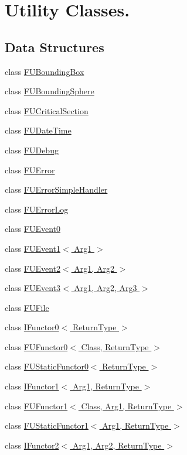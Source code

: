 \hypertarget{group__FUtils}{
\section{Utility Classes.}
\label{group__FUtils}
}
\subsection*{Data Structures}
\begin{DoxyCompactItemize}
\item 
class \hyperlink{classFUBoundingBox}{FUBoundingBox}
\item 
class \hyperlink{classFUBoundingSphere}{FUBoundingSphere}
\item 
class \hyperlink{classFUCriticalSection}{FUCriticalSection}
\item 
class \hyperlink{classFUDateTime}{FUDateTime}
\item 
class \hyperlink{classFUDebug}{FUDebug}
\item 
class \hyperlink{classFUError}{FUError}
\item 
class \hyperlink{classFUErrorSimpleHandler}{FUErrorSimpleHandler}
\item 
class \hyperlink{classFUErrorLog}{FUErrorLog}
\item 
class \hyperlink{classFUEvent0}{FUEvent0}
\item 
class \hyperlink{classFUEvent1}{FUEvent1$<$ Arg1 $>$}
\item 
class \hyperlink{classFUEvent2}{FUEvent2$<$ Arg1, Arg2 $>$}
\item 
class \hyperlink{classFUEvent3}{FUEvent3$<$ Arg1, Arg2, Arg3 $>$}
\item 
class \hyperlink{classFUFile}{FUFile}
\item 
class \hyperlink{classIFunctor0}{IFunctor0$<$ ReturnType $>$}
\item 
class \hyperlink{classFUFunctor0}{FUFunctor0$<$ Class, ReturnType $>$}
\item 
class \hyperlink{classFUStaticFunctor0}{FUStaticFunctor0$<$ ReturnType $>$}
\item 
class \hyperlink{classIFunctor1}{IFunctor1$<$ Arg1, ReturnType $>$}
\item 
class \hyperlink{classFUFunctor1}{FUFunctor1$<$ Class, Arg1, ReturnType $>$}
\item 
class \hyperlink{classFUStaticFunctor1}{FUStaticFunctor1$<$ Arg1, ReturnType $>$}
\item 
class \hyperlink{classIFunctor2}{IFunctor2$<$ Arg1, Arg2, ReturnType $>$}

\end{DoxyCompactItemize}
